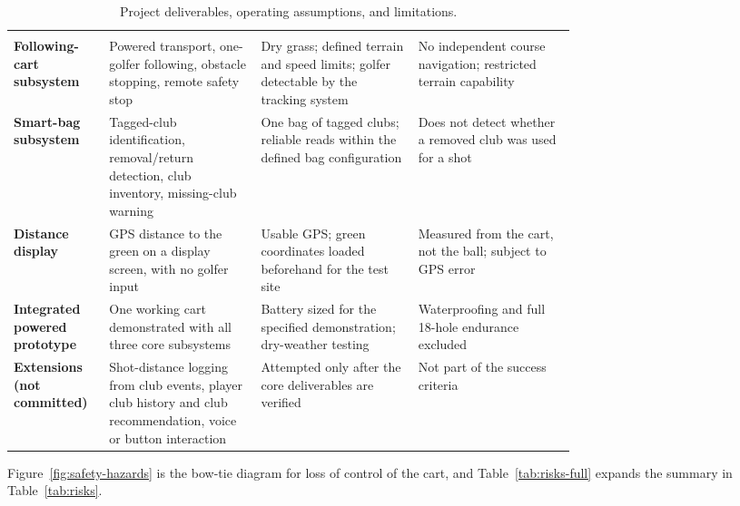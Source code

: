 \begin{singlespace}
\small
\setlength{\LTcapwidth}{\linewidth}
\begin{longtable}{@{}L{0.17\linewidth} L{0.27\linewidth} L{0.28\linewidth} L{\tabcolsep\relax}@{}}
\caption{Project deliverables, operating assumptions, and limitations.}\label{tab:intro-deliverables-full}\\
 &  &  &  \\
\midrule
\endfirsthead
{}
 &  &  &  \\
\midrule
\endhead
\bottomrule
\endfoot
\textbf{Following-cart subsystem} & Powered transport, one-golfer following, obstacle stopping, remote safety stop & Dry grass; defined terrain and speed limits; golfer detectable by the tracking system & No independent course navigation; restricted terrain capability \\
\addlinespace[3pt]
\textbf{Smart-bag subsystem} & Tagged-club identification, removal/return detection, club inventory, missing-club warning & One bag of tagged clubs; reliable reads within the defined bag configuration & Does not detect whether a removed club was used for a shot \\
\addlinespace[3pt]
\textbf{Distance display} & GPS distance to the green on a display screen, with no golfer input & Usable GPS; green coordinates loaded beforehand for the test site & Measured from the cart, not the ball; subject to GPS error \\
\addlinespace[3pt]
\textbf{Integrated powered prototype} & One working cart demonstrated with all three core subsystems & Battery sized for the specified demonstration; dry-weather testing & Waterproofing and full 18-hole endurance excluded \\
\addlinespace[3pt]
\textbf{Extensions (not committed)} & Shot-distance logging from club events, player club history and club recommendation, voice or button interaction & Attempted only after the core deliverables are verified & Not part of the success criteria \\
\end{longtable}
\end{singlespace}

\label{app:risks}
Figure~\ref{fig:safety-hazards} is the bow-tie diagram for loss of control of the cart, and Table~\ref{tab:risks-full} expands the summary in Table~\ref{tab:risks}.

